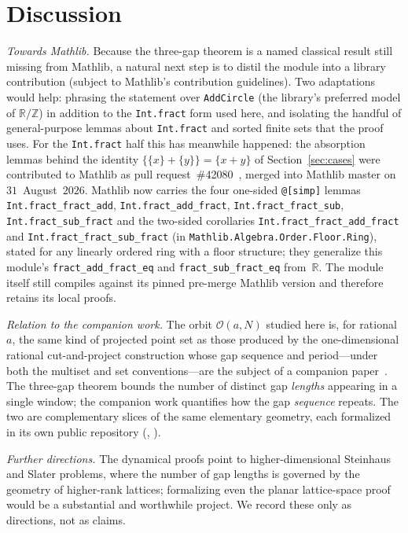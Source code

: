 \documentclass[11pt,reqno]{amsart}
\theoremstyle{plain}
\theoremstyle{definition}
\theoremstyle{remark}
\newcommand{\Z}{\mathbb{Z}}
\newcommand{\R}{\mathbb{R}}
\newcommand{\fract}[1]{\{#1\}}
\newcommand{\orb}{\mathcal{O}}
\newcommand{\code}[1]{\texttt{#1}}
\begin{document}
\section{Discussion}\label{sec:discussion}

\emph{Towards Mathlib.}  Because the three-gap theorem is a named classical
result still missing from Mathlib, a natural next step is to distil the module
into a library contribution (subject to Mathlib's contribution
guidelines).  Two adaptations would help: phrasing the statement
over \code{AddCircle} (the library's preferred model of $\R/\Z$) in addition to
the \code{Int.fract} form used here, and isolating the handful of general-purpose
lemmas about \code{Int.fract} and sorted finite sets that the proof uses.
For the \code{Int.fract} half this has meanwhile happened: the absorption
lemmas behind the identity $\fract{\fract{x}+\fract{y}}=\fract{x+y}$ of
Section~\ref{sec:cases} were contributed to Mathlib as pull
request~\#42080~\cite{KunertMathlib2026}, merged into Mathlib master on
$31$~August~$2026$.  Mathlib now carries the four one-sided \code{@[simp]}
lemmas \code{Int.fract\_fract\_add}, \code{Int.fract\_add\_fract},
\code{Int.fract\_fract\_sub}, \code{Int.fract\_sub\_fract} and the two-sided
corollaries \code{Int.fract\_fract\_add\_fract} and
\code{Int.fract\_fract\_sub\_fract} (in
\code{Mathlib.Algebra.Order.Floor.Ring}), stated for any linearly ordered
ring with a floor structure; they generalize this module's
\code{fract\_add\_fract\_eq} and \code{fract\_sub\_fract\_eq} from~$\R$.
The module itself still compiles against its pinned pre-merge Mathlib
version and therefore retains its local proofs.

\emph{Relation to the companion work.}  The orbit $\orb(a,N)$ studied here is,
for rational $a$, the same kind of projected point set as those produced by the
one-dimensional rational cut-and-project construction whose gap sequence and
period---under both the multiset and set conventions---are the subject of a
companion paper~\cite{Kunert2026}.  The three-gap theorem bounds the number
of distinct gap \emph{lengths} appearing in a single window; the companion work
quantifies how the gap \emph{sequence} repeats.  The two are complementary
slices of the same elementary geometry, each formalized in its own public
repository (\cite{Kunert2026}, \cite{KunertThreeGap2026}).

\emph{Further directions.}  The dynamical proofs point to higher-dimensional
Steinhaus and Slater problems, where the number of gap lengths is governed by
the geometry of higher-rank lattices; formalizing even the planar lattice-space
proof would be a substantial and worthwhile project.  We record these only as
directions, not as claims.
\end{document}
